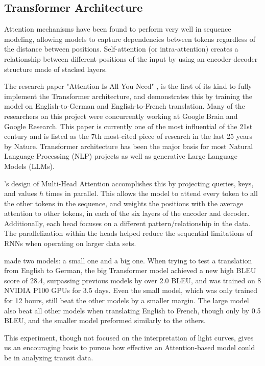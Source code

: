 \documentclass[letterpaper]{article} %
\begin{document}
\subsection{Transformer Architecture}
Attention mechanisms have been found to perform very well in sequence modeling, allowing models to capture dependencies between tokens regardless of the distance between positions. Self-attention (or intra-attention) creates a relationship between different positions of the input by using an encoder-decoder structure made of stacked layers.

The research paper "Attention Is All You Need" \cite{vaswani2017attentionneed}, is the first of its kind to fully implement the Transformer architecture, and demonstrates this by training the model on English-to-German and English-to-French translation. Many of the researchers on this project were concurrently working at Google Brain and Google Research. This paper is currently one of the most influential of the 21st century and is listed as the 7th most-cited piece of research in the last 25 years by Nature. Transformer architecture has been the major basis for most Natural Language Processing (NLP) projects as well as generative Large Language Models (LLMs).

\citeauthor{vaswani2017attentionneed}'s design of Multi-Head Attention accomplishes this by projecting queries, keys, and values $h$ times in parallel. This allows the model to attend every token to all the other tokens in the sequence, and weights the positions with the average attention to other tokens, in each of the six layers of the encoder and decoder. Additionally, each head focuses on a different pattern/relationship in the data. The parallelization within the heads helped reduce the sequential limitations of RNNs when operating on larger data sets.

\citeauthor{vaswani2017attentionneed} made two models: a small one and a big one. When trying to test a translation from English to German, the big Transformer model achieved a new high BLEU score of 28.4, surpassing previous models by over 2.0 BLEU, and was trained on 8 NVIDIA P100 GPUs for 3.5 days. Even the small model, which was only trained for 12 hours, still beat the other models by a smaller margin. The large model also beat all other models when translating English to French, though only by 0.5 BLEU, and the smaller model preformed similarly to the others.

This experiment, though not focused on the interpretation of light curves, gives us an encouraging basis to pursue how effective an Attention-based model could be in analyzing transit data.
\end{document}
